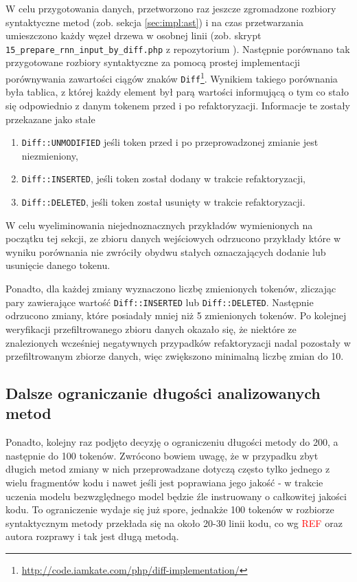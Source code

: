 \documentclass[12pt]{report}
\begin{document}
W celu przygotowania danych, przetworzono raz jeszcze zgromadzone rozbiory syntaktyczne metod (zob. sekcja \ref{sec:impl:ast}) i na czas przetwarzania umieszczono każdy węzeł drzewa w osobnej linii (zob. skrypt \texttt{15\_prepare\_rnn\_input\_by\_diff.php} z repozytorium \cite{fracz:refactor-extractor}). Następnie porównano tak przygotowane rozbiory syntaktyczne za pomocą prostej implementacji porównywania zawartości ciągów znaków \texttt{Diff}\footnote{\url{http://code.iamkate.com/php/diff-implementation/}}. Wynikiem takiego porównania była tablica, z której każdy element był parą wartości informującą o tym co stało się odpowiednio z danym tokenem przed i po refaktoryzacji. Informacje te zostały przekazane jako stałe

\begin{enumerate}
\item \texttt{Diff::UNMODIFIED} jeśli token przed i po przeprowadzonej zmianie jest niezmieniony,
\item \texttt{Diff::INSERTED}, jeśli token został dodany w trakcie refaktoryzacji,
\item \texttt{Diff::DELETED}, jeśli token został usunięty w trakcie refaktoryzacji.
\end{enumerate}

W celu wyeliminowania niejednoznacznych przykładów wymienionych na początku tej sekcji, ze zbioru danych wejściowych odrzucono przykłady które w wyniku porównania nie zwróciły obydwu stałych oznaczających dodanie lub usunięcie danego tokenu.
 
Ponadto, dla każdej zmiany wyznaczono liczbę zmienionych tokenów, zliczając pary zawierające wartość \texttt{Diff::INSERTED} lub \texttt{Diff::DELETED}. Następnie odrzucono zmiany, które posiadały mniej niż 5 zmienionych tokenów. Po kolejnej weryfikacji przefiltrowanego zbioru danych okazało się, że niektóre ze znalezionych wcześniej negatywnych przypadków refaktoryzacji nadal pozostały w przefiltrowanym zbiorze danych, więc zwiększono minimalną liczbę zmian do 10.

\subsection{Dalsze ograniczanie długości analizowanych metod}

Ponadto, kolejny raz podjęto decyzję o ograniczeniu długości metody do 200, a następnie do 100 tokenów.  Zwrócono bowiem uwagę, że w przypadku zbyt długich metod zmiany w nich przeprowadzane dotyczą często tylko jednego z wielu fragmentów kodu i nawet jeśli jest poprawiana jego jakość - w trakcie uczenia modelu bezwzględnego model będzie źle instruowany o całkowitej jakości kodu. To ograniczenie wydaje się już spore, jednakże 100 tokenów w rozbiorze syntaktycznym metody przekłada się na około 20-30 linii kodu, co wg \textcolor{red}{REF} oraz autora rozprawy i tak jest długą metodą.
\end{document}
